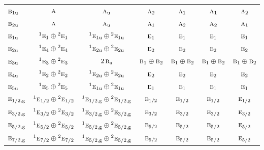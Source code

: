 \documentclass[10pt,a4paper]{article}
\numberwithin{equation}{section}
\newcommand{\irr}[1]{\text{\normalfont\scshape #1}}
\newcommand{\conjpair}[1]{{}^{#1}}
\newcommand{\ptag}[1]{\mathrm{#1}}
\begin{document}
{\begin{longtable}{@{}lcccccc@{}}
$\irr{b}_{1\ptag{u}}$ & $\irr{a}$ & $\irr{a}_{\ptag{u}}$ & $\irr{a}_{2}$ & $\irr{a}_{1}$ & $\irr{a}_{1}$ & $\irr{a}_{2}$\\
$\irr{b}_{2\ptag{u}}$ & $\irr{a}$ & $\irr{a}_{\ptag{u}}$ & $\irr{a}_{1}$ & $\irr{a}_{2}$ & $\irr{a}_{2}$ & $\irr{a}_{1}$\\
$\irr{e}_{1\ptag{u}}$ & $\conjpair{1}\irr{e}_{1}\oplus \conjpair{2}\irr{e}_{1}$ & $\conjpair{1}\irr{e}_{1\ptag{u}}\oplus \conjpair{2}\irr{e}_{1\ptag{u}}$ & $\irr{e}_{1}$ & $\irr{e}_{1}$ & $\irr{e}_{1}$ & $\irr{e}_{1}$\\
$\irr{e}_{2\ptag{u}}$ & $\conjpair{1}\irr{e}_{4}\oplus \conjpair{2}\irr{e}_{4}$ & $\conjpair{1}\irr{e}_{2\ptag{u}}\oplus \conjpair{2}\irr{e}_{2\ptag{u}}$ & $\irr{e}_{2}$ & $\irr{e}_{2}$ & $\irr{e}_{2}$ & $\irr{e}_{2}$\\
$\irr{e}_{3\ptag{u}}$ & $\conjpair{1}\irr{e}_{3}\oplus \conjpair{2}\irr{e}_{3}$ & $2\,\irr{b}_{\ptag{u}}$ & $\irr{b}_{1}\oplus \irr{b}_{2}$ & $\irr{b}_{1}\oplus \irr{b}_{2}$ & $\irr{b}_{1}\oplus \irr{b}_{2}$ & $\irr{b}_{1}\oplus \irr{b}_{2}$\\
$\irr{e}_{4\ptag{u}}$ & $\conjpair{1}\irr{e}_{2}\oplus \conjpair{2}\irr{e}_{2}$ & $\conjpair{1}\irr{e}_{2\ptag{u}}\oplus \conjpair{2}\irr{e}_{2\ptag{u}}$ & $\irr{e}_{2}$ & $\irr{e}_{2}$ & $\irr{e}_{2}$ & $\irr{e}_{2}$\\
$\irr{e}_{5\ptag{u}}$ & $\conjpair{1}\irr{e}_{5}\oplus \conjpair{2}\irr{e}_{5}$ & $\conjpair{1}\irr{e}_{1\ptag{u}}\oplus \conjpair{2}\irr{e}_{1\ptag{u}}$ & $\irr{e}_{1}$ & $\irr{e}_{1}$ & $\irr{e}_{1}$ & $\irr{e}_{1}$\\
$\irr{e}_{1/2,\ptag{g}}$ & $\conjpair{1}\irr{e}_{1/2}\oplus \conjpair{2}\irr{e}_{1/2}$ & $\conjpair{1}\irr{e}_{1/2,\ptag{g}}\oplus \conjpair{2}\irr{e}_{1/2,\ptag{g}}$ & $\irr{e}_{1/2}$ & $\irr{e}_{1/2}$ & $\irr{e}_{1/2}$ & $\irr{e}_{1/2}$\\
$\irr{e}_{3/2,\ptag{g}}$ & $\conjpair{1}\irr{e}_{3/2}\oplus \conjpair{2}\irr{e}_{3/2}$ & $\conjpair{1}\irr{e}_{3/2,\ptag{g}}\oplus \conjpair{2}\irr{e}_{3/2,\ptag{g}}$ & $\irr{e}_{3/2}$ & $\irr{e}_{3/2}$ & $\irr{e}_{3/2}$ & $\irr{e}_{3/2}$\\
$\irr{e}_{5/2,\ptag{g}}$ & $\conjpair{1}\irr{e}_{5/2}\oplus \conjpair{2}\irr{e}_{5/2}$ & $\conjpair{1}\irr{e}_{5/2,\ptag{g}}\oplus \conjpair{2}\irr{e}_{5/2,\ptag{g}}$ & $\irr{e}_{5/2}$ & $\irr{e}_{5/2}$ & $\irr{e}_{5/2}$ & $\irr{e}_{5/2}$\\
$\irr{e}_{7/2,\ptag{g}}$ & $\conjpair{1}\irr{e}_{7/2}\oplus \conjpair{2}\irr{e}_{7/2}$ & $\conjpair{1}\irr{e}_{5/2,\ptag{g}}\oplus \conjpair{2}\irr{e}_{5/2,\ptag{g}}$ & $\irr{e}_{5/2}$ & $\irr{e}_{5/2}$ & $\irr{e}_{5/2}$ & $\irr{e}_{5/2}$\\

\end{longtable}}
\end{document}
